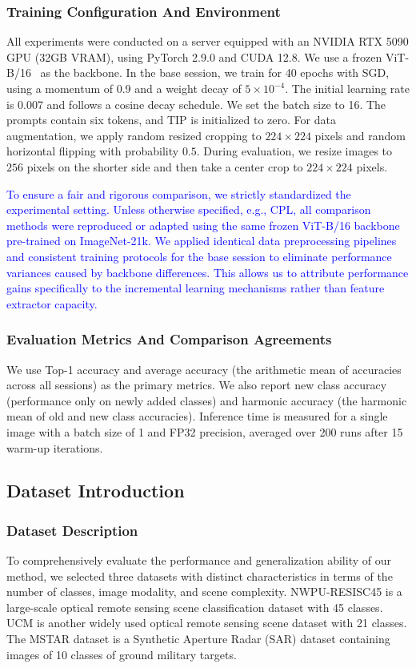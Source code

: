 ﻿\documentclass[letterpaper,journal]{IEEEtran}
\begin{document}
\subsubsection{Training Configuration And Environment}
All experiments were conducted on a server equipped with an NVIDIA RTX 5090 GPU (32GB VRAM), using PyTorch 2.9.0 and CUDA 12.8.
We use a frozen ViT-B/16~\cite{dosovitskiy2021, liu2024} as the backbone. In the base session, we train for 40 epochs with SGD, using a momentum of 0.9 and a weight decay of $5\times10^{-4}$. The initial learning rate is 0.007 and follows a cosine decay schedule. We set the batch size to 16. The prompts contain six tokens, and TIP is initialized to zero. For data augmentation, we apply random resized cropping to $224\times224$ pixels and random horizontal flipping with probability $0.5$. During evaluation, we resize images to $256$ pixels on the shorter side and then take a center crop to $224\times224$ pixels.

\textcolor{blue}{To ensure a fair and rigorous comparison, we strictly standardized the experimental setting. Unless otherwise specified, e.g., CPL, all comparison methods were reproduced or adapted using the same frozen ViT-B/16 backbone pre-trained on ImageNet-21k. We applied identical data preprocessing pipelines and consistent training protocols for the base session to eliminate performance variances caused by backbone differences. This allows us to attribute performance gains specifically to the incremental learning mechanisms rather than feature extractor capacity.}


\subsubsection{Evaluation Metrics And Comparison Agreements} We use Top-1 accuracy and average accuracy (the arithmetic mean of accuracies across all sessions) as the primary metrics. We also report new class accuracy (performance only on newly added classes) and harmonic accuracy (the harmonic mean of old and new class accuracies). Inference time is measured for a single image with a batch size of 1 and FP32 precision, averaged over 200 runs after 15 warm-up iterations.

\subsection{Dataset Introduction}

\subsubsection{Dataset Description} To comprehensively evaluate the performance and generalization ability of our method, we selected three datasets with distinct characteristics in terms of the number of classes, image modality, and scene complexity. NWPU-RESISC45\cite{cheng2017} is a large-scale optical remote sensing scene classification dataset with 45 classes. UCM\cite{ucm} is another widely used optical remote sensing scene dataset with 21 classes. The MSTAR\cite{mstar} dataset is a Synthetic Aperture Radar (SAR) dataset containing images of 10 classes of ground military targets.
\end{document}
